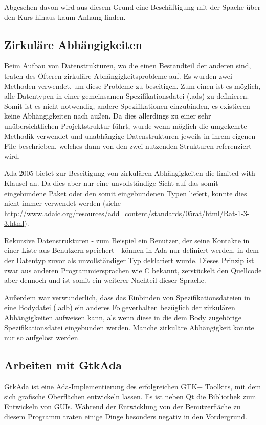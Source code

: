 \documentclass[12pt,a4paper,bibliography=totocnumbered,listof=totocnumbered]{scrartcl}
\begin{document}
Abgesehen davon wird aus diesem Grund eine Beschäftigung mit der Spache über den Kurs hinaus kaum Anhang finden.

\subsection{Zirkuläre Abhängigkeiten}
Beim Aufbau von Datenstrukturen, wo die einen Bestandteil der anderen sind, traten des Öfteren zirkuläre Abhängigkeitsprobleme auf. Es wurden zwei Methoden verwendet, um diese Probleme zu beseitigen. Zum einen ist es möglich, alle Datentypen in einer gemeinsamen Spezifikationsdatei (.ads) zu definieren. Somit ist es nicht notwendig, andere Spezifikationen einzubinden, es existieren keine Abhängigkeiten nach außen. Da dies allerdings zu einer sehr unübersichtlichen Projektstruktur führt, wurde wenn möglich die umgekehrte Methodik verwendet und unabhängige Datenstrukturen jeweils in ihrem eigenen File beschrieben, welches dann von den zwei nutzenden Strukturen referenziert wird.

Ada 2005 bietet zur Beseitigung von zirkulären Abhängigkeiten die \glqq{}limited with\grqq{}-Klausel an. Da dies aber nur eine unvollständige Sicht auf das somit eingebundene Paket oder den somit eingebundenen Typen liefert, konnte dies nicht immer verwendet werden (siehe \url{http://www.adaic.org/resources/add_content/standards/05rat/html/Rat-1-3-3.html}).


Rekursive Datenstrukturen - zum Beispiel ein Benutzer, der seine Kontakte in einer Liste aus Benutzern speichert - können in Ada nur definiert werden, in dem der Datentyp zuvor als unvollständiger Typ deklariert wurde. Dieses Prinzip ist zwar aus anderen Programmiersprachen wie C bekannt, zerstückelt den Quellcode aber dennoch und ist somit ein weiterer Nachteil dieser Sprache.


Außerdem war verwunderlich, dass das Einbinden von Spezifikationsdateien in eine Bodydatei (.adb) ein anderes Folgeverhalten bezüglich der zirkulären Abhängigkeiten aufweisen kann, als wenn diese in die dem Body zugehörige Spezifikationsdatei eingebunden werden. Manche zirkuläre Abhängigkeit konnte nur so aufgelöst werden.

\subsection{Arbeiten mit GtkAda}
GtkAda ist eine Ada-Implementierung des erfolgreichen GTK+ Toolkits, mit dem sich grafische Oberflächen entwickeln lassen. Es ist neben Qt die Bibliothek zum Entwickeln von GUIs. Während der Entwicklung von der Benutzerfläche zu diesem Programm traten einige Dinge besonders negativ in den Vordergrund.
\end{document}
